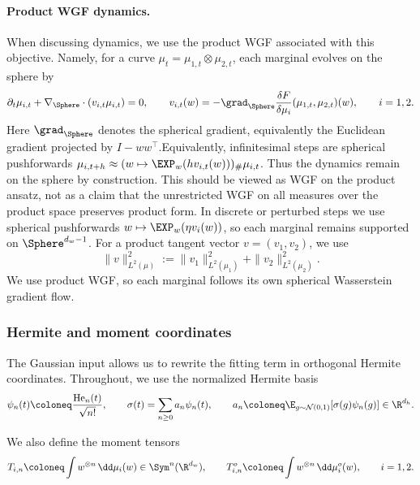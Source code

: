 \paragraph{Product WGF dynamics.}
When discussing dynamics, we use the product WGF associated with this objective. Namely, for a curve
\(\mu_t=\mu_{1,t}\otimes\mu_{2,t}\), each marginal evolves on the sphere by
\begin{equation}
    \partial_t\mu_{i,t}
    +\nabla_\Sphere\cdot(v_{i,t}\mu_{i,t})=0,
    \qquad
    v_{i,t}(w)
    =
    -\grad_\Sphere
    \frac{\delta F}{\delta \mu_i}(\mu_{1,t},\mu_{2,t})(w),
    \qquad i=1,2.
\end{equation}
Here \(\grad_\Sphere\) denotes the spherical gradient, equivalently the Euclidean gradient projected by \(I-ww^\top\).Equivalently, infinitesimal steps are spherical pushforwards
\(\mu_{i,t+h}\approx (w\mapsto \EXP_w(hv_{i,t}(w)))_\#\mu_{i,t}\).
Thus the dynamics remain on the sphere by construction. This should be viewed as WGF on the product ansatz, not as a claim that the unrestricted WGF on all measures over the product space preserves product form. In discrete or perturbed steps we use spherical pushforwards
\(w\mapsto \EXP_w(\eta v_i(w))\), so each marginal remains supported on \(\Sphere^{d_w-1}\).
For a product tangent vector \(v=(v_1,v_2)\), we use
\[
    \|v\|_{L^2(\mu)}^2
    :=
    \|v_1\|_{L^2(\mu_1)}^2+
    \|v_2\|_{L^2(\mu_2)}^2.
\]
We use product WGF, so each marginal follows its own spherical Wasserstein gradient flow.

\subsubsection{Hermite and moment coordinates}

The Gaussian input allows us to rewrite the fitting term in orthogonal Hermite coordinates.
Throughout, we use the normalized Hermite basis
\begin{equation}
    \psi_n(t) \coloneq \frac{\mathrm{He}_n(t)}{\sqrt{n!}},
    \qquad
    \sigma(t) = \sum_{n\ge 0} a_n\psi_n(t),
    \qquad
    a_n \coloneq \E_{g\sim \mathcal N(0,1)}[\sigma(g)\psi_n(g)] \in \R^{d_h}.
\end{equation}

We also define the moment tensors
\begin{equation}
    T_{i,n} \coloneq \int w^{\otimes n}\,\dd\mu_i(w) \in \Sym^n(\R^{d_w}),
    \qquad
    T_{i,n}^o \coloneq \int w^{\otimes n}\,\dd\mu_i^o(w),
    \qquad i=1,2.
\end{equation}

